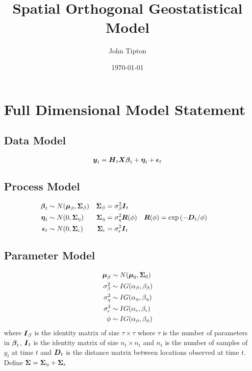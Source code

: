 \documentclass[fleqn]{article}
\title{Spatial Orthogonal Geostatistical Model}
\author{John Tipton}
\date{\today}
\def\bm#1{\mbox{\boldmath $#1$}}
\begin{document}
\maketitle

\section{Full Dimensional Model Statement}
%
\subsection{Data Model}
\begin{align*}
\bm{y}_t & = \bm{H}_t \bm{X} \bm{\beta}_t + \bm{\eta}_t + \bm{\epsilon}_t\\
%
\end{align*}
%
\subsection{Process Model}
%
\begin{align*}
%
\bm{\beta}_t & \sim N(\bm{\mu}_\beta, \bm{\Sigma}_\beta) & \bm{\Sigma}_\beta &  = \sigma^2_\beta \bm{I}_t\\
%
\bm{\eta}_t & \sim N(0, \bm{\Sigma}_\eta) & \bm{\Sigma}_\eta &  = \sigma^2_\eta \bm{R}(\phi) & \bm{R}(\phi) & = \exp{( - \bm{D}_t / \phi)}\\
%
\bm{\epsilon}_t & \sim N(0, \bm{\Sigma}_\epsilon) & \bm{\Sigma}_\epsilon &  = \sigma^2_\epsilon \bm{I}_t\\
%
\end{align*}
%
\subsection{Parameter Model}
%
\begin{align*}
%
\bm{\mu}_\beta & \sim N(\bm{\mu}_0, \bm{\Sigma}_0)\\
%
\sigma^2_\beta & \sim IG(\alpha_\beta, \beta_\beta)\\
%
\sigma^2_\eta & \sim IG(\alpha_\eta, \beta_\eta)\\
%
\sigma^2_\epsilon & \sim IG(\alpha_\epsilon, \beta_\epsilon)\\
%
\phi & \sim IG(\alpha_\phi, \beta_\phi)
\end{align*}
%
where $\bm{I}_\beta$ is the identity matrix of size $\tau \times \tau$ where $\tau$ is the number of parameters in $\bm{\beta}_t$, $\bm{I}_t$ is the identity matrix of size $n_t \times n_t$ and $n_t$ is the number of samples of $y_t$ at time $t$ and $\bm{D}_t$ is the distance matrix between locations observed at time $t$. Define $\bm{\Sigma} = \bm{\Sigma}_\eta + \bm{\Sigma}_\epsilon$
%
\end{document}
